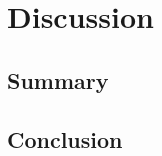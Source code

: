 


\chapter{Discussion}\label{cha:discussion}









\section{Summary}\label{sec:summary}

\section{Conclusion\label{sec:conclusions}}
